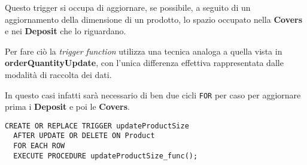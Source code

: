 Questo trigger si occupa di aggiornare, se possibile, a seguito di un aggiornamento della dimensione di un prodotto, lo spazio occupato nella \textbf{Covers} e nei \textbf{Deposit} che lo riguardano.

Per fare ciò la \textit{trigger function} utilizza una tecnica analoga a quella vista in \textbf{orderQuantityUpdate}, con l'unica differenza effettiva rappresentata dalle modalità di raccolta dei dati.

In questo casi infatti sarà necessario di ben due cicli \lstinline{FOR} per caso per aggiornare prima i \textbf{Deposit} e poi le \textbf{Covers}.

\begin{lstlisting}[caption={Trigger per implementare \textbf{updateProductSize}}]
  CREATE OR REPLACE TRIGGER updateProductSize
  AFTER UPDATE OR DELETE ON Product
  FOR EACH ROW
  EXECUTE PROCEDURE updateProductSize_func();
\end{lstlisting}

